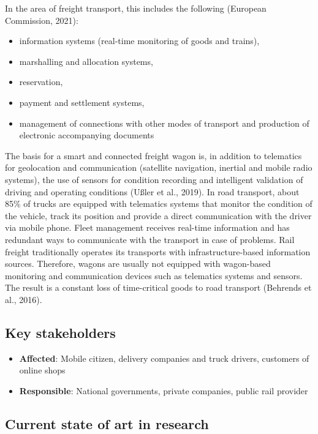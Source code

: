 \documentclass[
]{book}
\providecommand{\tightlist}{%
  \setlength{\itemsep}{0pt}\setlength{\parskip}{0pt}}
\begin{document}
In the area of freight transport, this includes the following (European Commission, 2021):

\begin{itemize}
\tightlist
\item
  information systems (real-time monitoring of goods and trains),
\item
  marshalling and allocation systems,
\item
  reservation,
\item
  payment and settlement systems,
\item
  management of connections with other modes of transport and production of electronic accompanying documents
\end{itemize}

The basis for a smart and connected freight wagon is, in addition to telematics for geolocation and communication (satellite navigation, inertial and mobile radio systems), the use of sensors for condition recording and intelligent validation of driving and operating conditions (Ußler et al., 2019). In road transport, about 85\% of trucks are equipped with telematics systems that monitor the condition of the vehicle, track its position and provide a direct communication with the driver via mobile phone. Fleet management receives real-time information and has redundant ways to communicate with the transport in case of problems. Rail freight traditionally operates its transports with infrastructure-based information sources. Therefore, wagons are usually not equipped with wagon-based monitoring and communication devices such as telematics systems and sensors. The result is a constant loss of time-critical goods to road transport (Behrends et al., 2016).

\hypertarget{key-stakeholders-26}{%
\subsection*{Key stakeholders}\label{key-stakeholders-26}}

\begin{itemize}
\tightlist
\item
  \textbf{Affected}: Mobile citizen, delivery companies and truck drivers, customers of online shops
\item
  \textbf{Responsible}: National governments, private companies, public rail provider
\end{itemize}

\hypertarget{current-state-of-art-in-research-26}{%
\subsection*{Current state of art in research}\label{current-state-of-art-in-research-26}}
\end{document}
